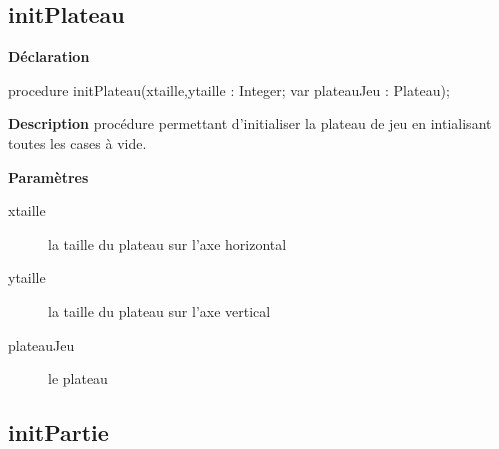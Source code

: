 \documentclass{report}
\newif\ifpdf
\begin{document}
\subsection*{initPlateau}
\fi
\label{Initialisation-initPlateau}
\begin{list}{}{
\setlength{\itemindent}{0cm}
\setlength{\listparindent}{0cm}
\setlength{\leftmargin}{\evensidemargin}
\addtolength{\leftmargin}{\tmplength}
\settowidth{\labelsep}{X}
\addtolength{\leftmargin}{\labelsep}
\setlength{\labelwidth}{\tmplength}
}
\item[\textbf{Déclaration}\hfill]
\ifpdf
\begin{flushleft}
\fi
\begin{ttfamily}
procedure initPlateau(xtaille,ytaille : Integer; var plateauJeu : Plateau);\end{ttfamily}

\ifpdf
\end{flushleft}
\fi

\par
\item[\textbf{Description}]
procédure permettant d'initialiser la plateau de jeu en intialisant toutes les cases à vide.   \par
\item[\textbf{Paramètres}]
\begin{description}
\item[xtaille] la taille du plateau sur l'axe horizontal
\item[ytaille] la taille du plateau sur l'axe vertical
\item[plateauJeu] le plateau
\end{description}


\end{list}
\ifpdf
\subsection*{\large{\textbf{initPartie}}\normalsize\hspace{1ex}\hrulefill}
\else
\end{document}
